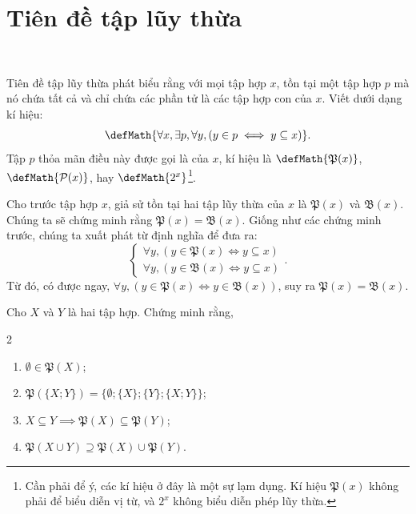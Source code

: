 \section{Tiên đề tập lũy thừa}

\

Tiên đề tập lũy thừa phát biểu rằng với mọi tập hợp $x$, tồn tại một tập hợp $p$ mà nó chứa tất cả và chỉ chứa các phần tử là các tập hợp con của $x$. Viết dưới dạng kí hiệu:
\begin{equation*}
    \defMath{\forall x, \exists p, \forall y, \left( y \in p \iff y \subseteq x \right)}.
\end{equation*}
Tập $p$ thỏa mãn điều này được gọi là  của $x$, kí hiệu là $\defMath{\mathfrak{P}(x)}$, $\defMath{\mathcal{P}(x)}$, hay $\defMath{2^x}$\footnote{Cần phải để ý, các kí hiệu ở đây là một sự lạm dụng. Kí hiệu $\mathfrak{P}(x)$ không phải để biểu diễn vị từ, và $2^x$ không biểu diễn phép lũy thừa.}.

Cho trước tập hợp $x$, giả sử tồn tại hai tập lũy thừa của $x$ là $\mathfrak{P}(x)$ và $\mathfrak{B}(x)$. Chúng ta sẽ chứng minh rằng $\mathfrak{P}(x) = \mathfrak{B}(x)$. Giống như các chứng minh trước, chúng ta xuất phát từ định nghĩa để đưa ra:
\begin{equation*}
    \begin{cases}
        \forall y, \left( y \in \mathfrak{P}(x) \iff y \subseteq x \right) \\
        \forall y, \left( y \in \mathfrak{B}(x) \iff y \subseteq x \right)
    \end{cases}.
\end{equation*}
Từ đó, có được ngay, $\forall y, (y \in \mathfrak{P}(x) \iff y \in \mathfrak{B}(x))$, suy ra $\mathfrak{P}(x) = \mathfrak{B}(x)$.

\exercise Cho $X$ và $Y$ là hai tập hợp. Chứng minh rằng,
\begin{multicols}{2}
    \begin{enumerate}
        \item $\emptyset \in \mathfrak{P}(X)$;
        \item $\mathfrak{P}(\{X; Y\}) = \{\emptyset; \{X\}; \{Y\}; \{X; Y\}\}$;
        \item $X \subseteq Y \implies \mathfrak{P}(X) \subseteq \mathfrak{P}(Y)$;
        \item $\mathfrak{P}(X \cup Y) \supseteq \mathfrak{P}(X) \cup \mathfrak{P}(Y)$.
    \end{enumerate}
\end{multicols}

